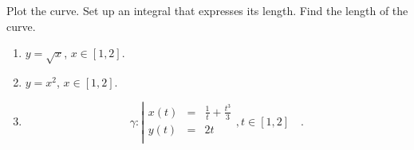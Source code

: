 Plot the curve. Set up an integral that expresses its length. Find the length of the curve. 
\begin{enumerate}
\item $y=\sqrt{x}$, $x\in [1, 2]$.
\item $y=x^2$, $x\in [1, 2]$.
\item 
\begin{equation*}
\gamma:\left| 
\begin{array}{rcl}
x(t)&=&\frac{1}{t}+\frac{t^3}{3}\\
y(t)&=&2t\\
\end{array}\right., t\in [1,2]\quad .
\end{equation*}
\end{enumerate}
